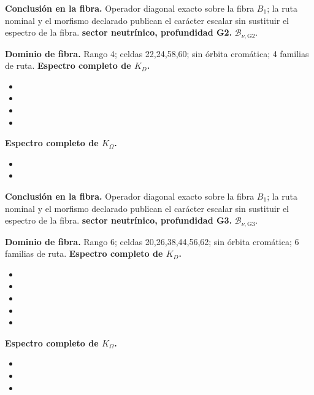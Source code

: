 \noindent\textbf{Conclusión en la fibra.} Operador diagonal exacto sobre la fibra \(B_1\); la ruta nominal y el morfismo declarado publican el carácter escalar sin sustituir el espectro de la fibra.
\medskip
{}
\noindent\textbf{sector neutrínico, profundidad G2.} \(\mathcal B_{\nu,\mathrm{G2}}\).\par
\noindent\textbf{Dominio de fibra.} Rango 4; celdas 22,24,58,60; sin órbita cromática; 4 familias de ruta.
\noindent\textbf{Espectro completo de \(K_D\).}
\begin{itemize}
\item \texttt{}
\item \texttt{}
\item \texttt{}
\item \texttt{}
\end{itemize}
\noindent\textbf{Espectro completo de \(K_\Omega\).}
\begin{itemize}
\item \texttt{}
\item \texttt{}
\end{itemize}
\noindent\textbf{Conclusión en la fibra.} Operador diagonal exacto sobre la fibra \(B_1\); la ruta nominal y el morfismo declarado publican el carácter escalar sin sustituir el espectro de la fibra.
\medskip
{}
\noindent\textbf{sector neutrínico, profundidad G3.} \(\mathcal B_{\nu,\mathrm{G3}}\).\par
\noindent\textbf{Dominio de fibra.} Rango 6; celdas 20,26,38,44,56,62; sin órbita cromática; 6 familias de ruta.
\noindent\textbf{Espectro completo de \(K_D\).}
\begin{itemize}
\item \texttt{}
\item \texttt{}
\item \texttt{}
\item \texttt{}
\item \texttt{}
\end{itemize}
\noindent\textbf{Espectro completo de \(K_\Omega\).}
\begin{itemize}
\item \texttt{}
\item \texttt{}
\item \texttt{}
\end{itemize}
